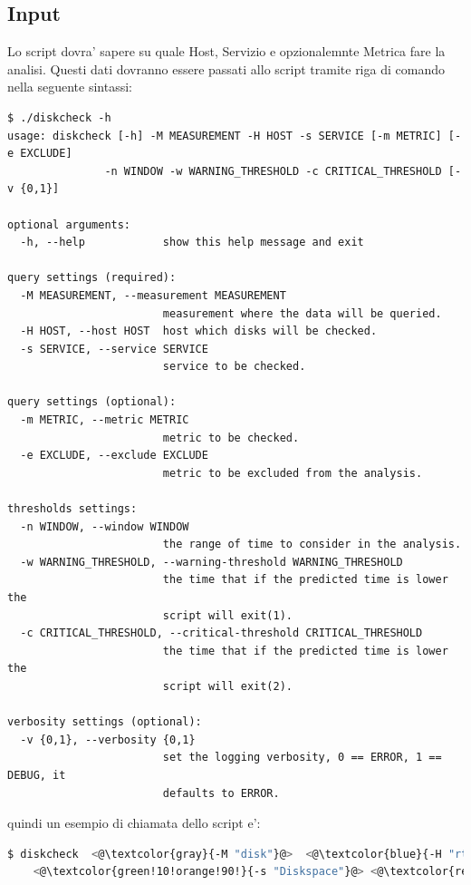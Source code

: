 \documentclass{article}
\begin{document}
\subsection*{Input}
Lo script dovra' sapere su quale Host, Servizio e opzionalemnte Metrica fare la analisi.
Questi dati dovranno essere passati allo script tramite riga di comando nella seguente sintassi:
\begin{lstlisting}[]
$ ./diskcheck -h
usage: diskcheck [-h] -M MEASUREMENT -H HOST -s SERVICE [-m METRIC] [-e EXCLUDE]
               -n WINDOW -w WARNING_THRESHOLD -c CRITICAL_THRESHOLD [-v {0,1}]

optional arguments:
  -h, --help            show this help message and exit

query settings (required):
  -M MEASUREMENT, --measurement MEASUREMENT
                        measurement where the data will be queried.
  -H HOST, --host HOST  host which disks will be checked.
  -s SERVICE, --service SERVICE
                        service to be checked.

query settings (optional):
  -m METRIC, --metric METRIC
                        metric to be checked.
  -e EXCLUDE, --exclude EXCLUDE
                        metric to be excluded from the analysis.

thresholds settings:
  -n WINDOW, --window WINDOW
                        the range of time to consider in the analysis.
  -w WARNING_THRESHOLD, --warning-threshold WARNING_THRESHOLD
                        the time that if the predicted time is lower the
                        script will exit(1).
  -c CRITICAL_THRESHOLD, --critical-threshold CRITICAL_THRESHOLD
                        the time that if the predicted time is lower the
                        script will exit(2).

verbosity settings (optional):
  -v {0,1}, --verbosity {0,1}
                        set the logging verbosity, 0 == ERROR, 1 == DEBUG, it
                        defaults to ERROR.
\end{lstlisting}

quindi un esempio di chiamata dello script e':
\begin{lstlisting}[language=Bash]
$ diskcheck  <@\textcolor{gray}{-M "disk"}@>  <@\textcolor{blue}{-H "rt-sccm01-p1.idolrt.regione.toscana.it"}@> 
    <@\textcolor{green!10!orange!90!}{-s "Diskspace"}@> <@\textcolor{red}{-m "C:/"}@> <@\textcolor{green!20!blue!80!}{-n "1d"}@> <@\textcolor{black!30!green!70!}{-w "4w"}@> <@\textcolor{black!30!magenta!70!}{-c "1w"}@>
\end{lstlisting}
\end{document}
